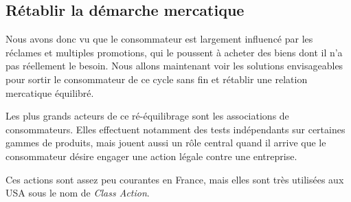 \subsection{Rétablir la démarche mercatique}
\medbreak
Nous avons donc vu que le consommateur est largement influencé par les réclames et multiples promotions, qui le poussent à acheter des biens dont il n'a pas réellement le besoin. Nous allons maintenant voir les solutions envisageables pour sortir le consommateur de ce cycle sans fin et rétablir une relation mercatique équilibré.

\smallbreak
Les plus grands acteurs de ce ré-équilibrage sont les associations de consommateurs. %
Elles effectuent notamment des tests indépendants sur certaines gammes de produits, mais jouent aussi un rôle central quand il arrive que le consommateur désire engager une action légale contre une entreprise.

Ces actions sont assez peu courantes en France, mais elles sont très utilisées aux USA sous le nom de \textit{Class Action}.
